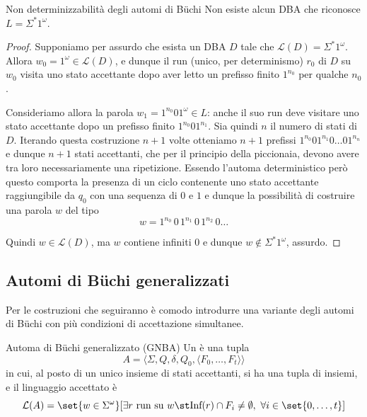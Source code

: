 \begin{theorem}{Non determinizzabilità degli automi di Büchi}
  Non esiste alcun DBA che riconosce \(L = \Sigma^* 1^\omega\).
\end{theorem}
\begin{proof}
  Supponiamo per assurdo che esista un DBA \(D\) tale che \(\mathcal{L}(D) = \Sigma^* 1^\omega\).
  Allora \(w_0 = 1^\omega \in \mathcal{L}(D)\), e dunque il run (unico, per determinismo) \(r_0\) di \(D\) su \(w_0\) visita uno stato accettante dopo aver letto un prefisso finito \(1^{n_0}\) per qualche \(n_0\).

  Consideriamo allora la parola \(w_1 = 1^{n_0} 0 1^\omega \in L\): anche il suo run deve visitare uno stato accettante dopo un prefisso finito \(1^{n_0} 0 1^{n_1}\). Sia quindi \(n\) il numero di stati di \(D\). Iterando questa costruzione \(n+1\) volte otteniamo \(n+1\) prefissi \(1^{n_0} 0 1^{n_1} 0 \ldots 0 1^{n_{n}}\) e dunque \(n+1\) stati accettanti, che per il principio della piccionaia, devono avere tra loro necessariamente una ripetizione. Essendo l'automa deterministico però questo comporta la presenza di un ciclo contenente uno stato accettante raggiungibile da \(q_0\) con una sequenza di \(0\) e \(1\) e dunque la possibilità di costruire una parola \(w\) del tipo
  \[w = 1^{n_0}\, 0\, 1^{n_1}\, 0\, 1^{n_2}\, 0 \ldots\]
  
  Quindi \(w \in \mathcal{L}(D)\), ma \(w\) contiene infiniti \(0\) e dunque \(w \notin \Sigma^* 1^\omega\), assurdo.
\end{proof}

\subsection{Automi di Büchi generalizzati}

Per le costruzioni che seguiranno è comodo introdurre una variante degli automi di Büchi con più condizioni di accettazione simultanee.

\begin{definition}{Automa di Büchi generalizzato (GNBA)}
  Un  è una tupla
  \[A = \langle\Sigma,Q,\delta,Q_0,\langle F_0, \ldots,F_t\rangle\rangle\]
  in cui, al posto di un unico insieme di stati accettanti, si ha una tupla di insiemi, e il linguaggio accettato è
  \[\mathcal{L}(A)= \set{w\in\Sigma^\omega}[\exists r \text{ run su } w \st \text{Inf}(r) \cap F_i \neq \emptyset,\ \forall i \in \set{0,\ldots,t}]\]
\end{definition}


